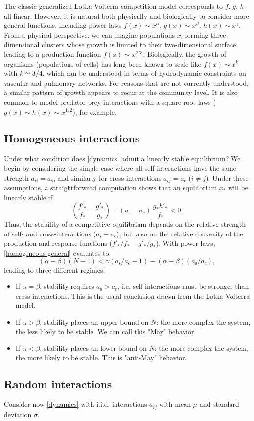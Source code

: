 \documentclass[%
 reprint,
 amsmath,amssymb,
 aps,
]{revtex4-2}
\begin{document}
The classic generalized Lotka-Volterra competition model corresponds to $f$, $g$, $h$ all linear. However, it is natural both physically and biologically to consider more general functions, including power laws $f(x)\sim x^\alpha$, $g(x)\sim x^\beta$, $h(x) \sim x^\gamma$. From a physical perspective, we can imagine populations $x_i$ forming three-dimensional clusters whose growth is limited to their two-dimensional surface, leading to a production function $f(x) \sim x^{2/3}$. Biologically, the growth of organisms (populations of cells) has long been known to scale like $f(x) \sim x^k$ with $k\simeq 3/4$, which can be understood in terms of hydrodynamic constraints on vascular and pulmonary networks. For reasons that are not currently understood, a similar pattern of growth appears to recur at the community level. It is also common to model predator-prey interactions with a square root laws ($g(x) \sim h(x) \sim x^{1/2}$), for example. 

\subsection{Homogeneous interactions}

Under what condition does \eqref{dynamics} admit a linearly stable equilibrium? We begin by considering the simple case where all self-interactions have the same strength $a_{ii} = a_{\textrm{s}}$, and similarly for cross-interactions $a_{ij} = a_{\textrm{c}}$ ($i\neq j$). Under these assumptions, a straightforward computation shows that an equilibrium $x_*$ will be linearly stable if  
\begin{equation}\label{homogeneous-general}
    \left(\frac{f'_*}{f_*} - \frac{g'_*}{g_*}\right) + (a_{\textrm{s}} - a_{\textrm{c}})\,\frac{g_*h'_*}{f_*} < 0. 
\end{equation}
Thus, the stability of a competitive equilibrium depends on the relative strength of self- and cross-interactions ($a_{\textrm{s}} - a_{\textrm{c}}$), but also on the relative convexity of the production and response functions ($f'_*/f_* - g'_*/g_*$). With power laws, \eqref{homogeneous-general} evaluates to 
\begin{equation}
    (\alpha - \beta)(N-1) < \gamma(a_{\textrm{s}}/a_{\textrm{c}}- 1) - (\alpha - \beta)(a_{\textrm{s}}/a_{\textrm{c}}),
\end{equation}
leading to three different regimes:
\begin{itemize}
    \item If $\alpha = \beta$, stability requires $a_{\textrm{s}} > a_{\textrm{c}}$, i.e. self-interactions must be stronger than cross-interactions. This is the usual conclusion drawn from the Lotka-Volterra model. 
    \item If $\alpha > \beta$, stability places an upper bound on $N$: the more complex the system, the less likely to be stable. We can call this "May" behavior.
    \item If $\alpha < \beta$, stability places an lower bound on $N$: the more complex the system, the more likely to be stable. This is "anti-May" behavior.
\end{itemize}

\subsection{Random interactions}

Consider now \eqref{dynamics} with i.i.d. interactions $a_{ij}$ with mean $\mu$ and standard deviation $\sigma$. 
\end{document}
